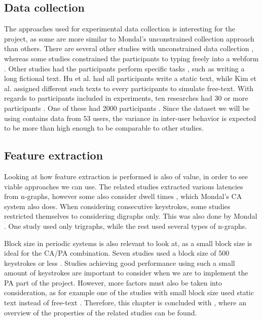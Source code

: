 \documentclass[informationsecurity]{gucmasterproject}
\begin{document}
\subsection{Data collection}
\label{sec:related-overview-collection}
The approaches used for experimental data collection is interesting for the project, as some are more similar to Mondal's \cite{mondal} unconstrained collection approach than others.
There are several other studies with unconstrained data collection \cite{Ahmed, BOURS201236, superResults, sliding, Janakiraman2007,  Pinto2014}, whereas some studies constrained the participants to typing freely into a webform \cite{davoudi2009, davoudi2010, gnp, Solami}.
Other studies had the participants perform specific tasks \cite{KIM2017, monaco, Monrose,  park, 900words}, such as writing a long fictional text.
Hu et al. \cite{hu} had all participants write a static text, while Kim et al. \cite{KIM2017} assigned different such texts to every participants to simulate free-text.
With regards to participants included in experiments, ten researches had 30 or more participants \cite{Messerman, gnp, Ahmed, superResults, KIM2017, 900words, sliding, Monrose, park, monaco}.
One of these had 2000 participants \cite{900words}.
Since the dataset we will be using \cite{mondal} contains data from 53 users, the variance in inter-user behavior is expected to be more than high enough to be comparable to other studies.

\subsection{Feature extraction}
Looking at how feature extraction is performed is also of value, in order to see viable approaches we can use.
The related studies extracted various latencies from n-graphs, however some also consider dwell times \cite{Pinto2014, superResults, KIM2017, Ahmed, Monrose, Janakiraman2007, monaco, BOURS201236}, which Mondal's \cite{mondal} CA system also does.
When considering consecutive keystrokes, some studies \cite{davoudi2009, davoudi2010, KIM2017, Ahmed, Janakiraman2007, Solami, BOURS201236, Monrose, park, monaco} restricted themselves to considering digraphs only.
This was also done by Mondal \cite{mondal}.
One study \cite{900words} used only trigraphs, while the rest used several types of n-graphs.

Block size in periodic systems is also relevant to look at, as a small block size is ideal for the CA/PA combination.
Seven studies used a block size of 500 keystrokes or less \cite{superResults, Messerman, Pinto2014, Ahmed, hu, park}.
Studies achieving good performance using such a small amount of keystrokes are important to consider when we are to implement the PA part of the project.
However, more factors must also be taken into consideration, as for example one of the studies with small block size used static text instead of free-text \cite{hu}.
Therefore, this chapter is concluded with , where an overview of the properties of the related studies can be found.
\end{document}
